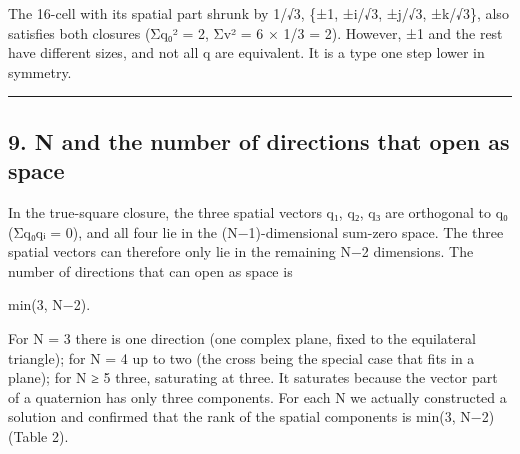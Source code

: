\documentclass[
  a4paper,
]{article}
\begin{document}
The 16-cell with its spatial part shrunk by 1/√3, \{±1, ±i/√3, ±j/√3,
±k/√3\}, also satisfies both closures (Σq₀² = 2, Σ\textbar v\textbar² =
6 × 1/3 = 2). However, ±1 and the rest have different sizes, and not all
q are equivalent. It is a type one step lower in symmetry.

\begin{center}\rule{0.5\linewidth}{0.5pt}\end{center}

\subsection{9. N and the number of directions that open as
space}\label{n-and-the-number-of-directions-that-open-as-space}

In the true-square closure, the three spatial vectors q₁, q₂, q₃ are
orthogonal to q₀ (Σq₀qᵢ = 0), and all four lie in the (N−1)-dimensional
sum-zero space. The three spatial vectors can therefore only lie in the
remaining N−2 dimensions. The number of directions that can open as
space is

min(3, N−2).

For N = 3 there is one direction (one complex plane, fixed to the
equilateral triangle); for N = 4 up to two (the cross being the special
case that fits in a plane); for N ≥ 5 three, saturating at three. It
saturates because the vector part of a quaternion has only three
components. For each N we actually constructed a solution and confirmed
that the rank of the spatial components is min(3, N−2) (Table 2).
\end{document}
